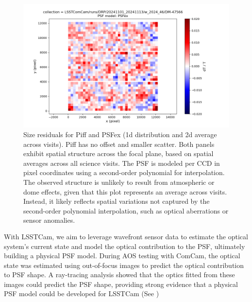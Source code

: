 \begin{figure}
	\includegraphics[scale=0.3]{figures/0_dT_2d_PSFex}
        \caption{\small Size residuals for Piff and PSFex (1d distribution and 2d average across visits). Piff has no offset and smaller scatter. Both panels 
        exhibit spatial structure across the focal plane, based on spatial averages across all science visits. The PSF is modeled per CCD in pixel coordinates 
        using a second-order polynomial for interpolation. The observed structure is unlikely to result from atmospheric or dome effects, given that this plot 
        represents an average across visits. Instead, it likely reflects spatial variations not captured by the second-order polynomial interpolation, such as 
        optical aberrations or sensor anomalies.}
        \label{fig:DT_plot}
\end{figure}




With LSSTCam, we aim to leverage wavefront sensor data to estimate the optical system's current state and model the optical contribution to the PSF, ultimately building a physical PSF model. During AOS testing with ComCam, the optical state was estimated using out-of-focus images to predict the optical contribution to PSF shape. A ray-tracing analysis showed that the optics fitted from these images could predict the PSF shape, providing strong evidence that a physical PSF model could be developed for LSSTCam (See )


